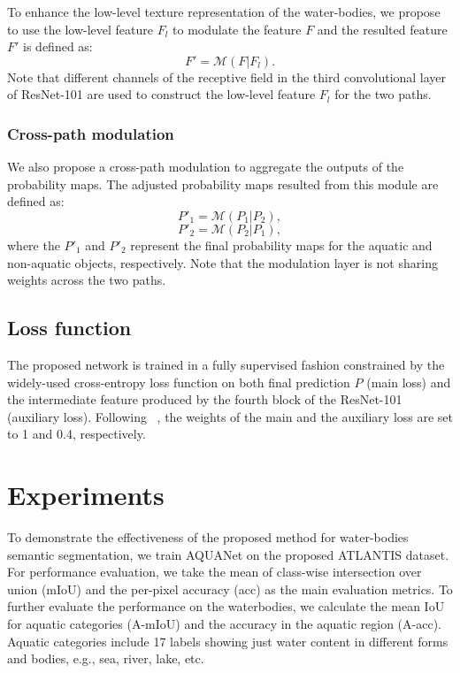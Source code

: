 \documentclass{article}
\begin{document}
To enhance the low-level texture representation of the water-bodies, we propose to use the low-level feature $F_l$ to modulate the feature $F$ and the resulted feature $F'$ is defined as:
\begin{equation} 
F' = \mathcal{M}(F | F_l).
\end{equation}
Note that different channels of the receptive field in the third convolutional layer of ResNet-101 are used to construct the low-level feature $F_l$ for the two paths.

\subsubsection{Cross-path modulation}
We also propose a cross-path modulation to aggregate the outputs of the probability maps. The adjusted probability maps resulted from this module are defined as:
\begin{equation} 
P'_1 = \mathcal{M}(P_1 | P_2),
\end{equation}
\begin{equation} 
P'_2 = \mathcal{M}(P_2 | P_1),
\end{equation}
where the $P'_1$ and $P'_2$ represent the final probability maps for the aquatic and non-aquatic objects, respectively. Note that the modulation layer is not sharing weights across the two paths.

\subsection{Loss function}

The proposed network is trained in a fully supervised fashion constrained by the widely-used cross-entropy loss function on both final prediction $P$ (main loss) and the intermediate feature produced by the fourth block of the ResNet-101 (auxiliary loss). Following \citeauthor{zhao2017pyramid}~\cite{zhao2017pyramid}, the weights of the main and the auxiliary loss are set to 1 and 0.4, respectively.

\section{Experiments}

To demonstrate the effectiveness of the proposed method for water-bodies semantic segmentation, we train AQUANet on the proposed ATLANTIS dataset.
For performance evaluation, we take the mean of class-wise intersection over union (mIoU) and the per-pixel accuracy (acc) as the main evaluation metrics.
To further evaluate the performance on the waterbodies, we calculate the mean IoU for aquatic categories (A-mIoU) and the accuracy in the aquatic region (A-acc). Aquatic categories include 17 labels showing just water content in different forms and bodies, e.g., sea, river, lake, etc.
\end{document}
